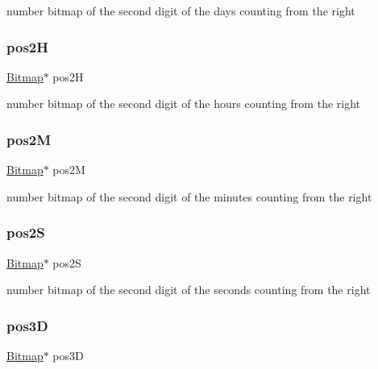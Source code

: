 number bitmap of the second digit of the days counting from the right 

\mbox{\label{struct_countdown_a2bd11b0753bf2e5db41448090cd63383}} 
\subsubsection{\texorpdfstring{pos2H}{pos2H}}
{\footnotesize\ttfamily \hyperlink{struct_bitmap}{Bitmap}$\ast$ pos2H}



number bitmap of the second digit of the hours counting from the right 

\mbox{\label{struct_countdown_ab681829c70b665852790841ebfb07d2d}} 
\subsubsection{\texorpdfstring{pos2M}{pos2M}}
{\footnotesize\ttfamily \hyperlink{struct_bitmap}{Bitmap}$\ast$ pos2M}



number bitmap of the second digit of the minutes counting from the right 

\mbox{\label{struct_countdown_a80db50da83aa5fe4121181b08f4e284a}} 
\subsubsection{\texorpdfstring{pos2S}{pos2S}}
{\footnotesize\ttfamily \hyperlink{struct_bitmap}{Bitmap}$\ast$ pos2S}



number bitmap of the second digit of the seconds counting from the right 

\mbox{\label{struct_countdown_aca363fff11b394450053a007b084e551}} 
\subsubsection{\texorpdfstring{pos3D}{pos3D}}
{\footnotesize\ttfamily \hyperlink{struct_bitmap}{Bitmap}$\ast$ pos3D}



